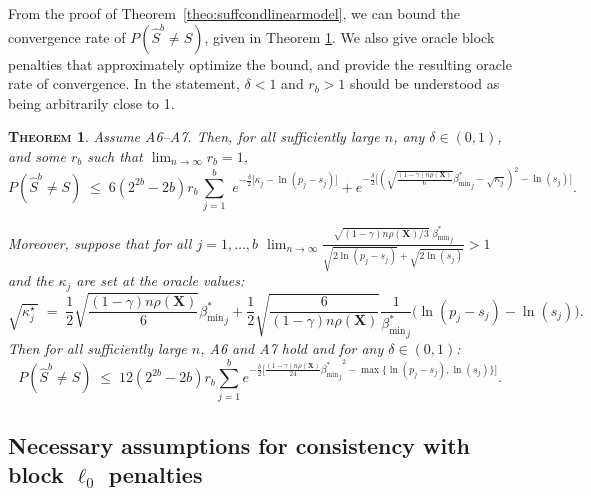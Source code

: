 \documentclass[aos]{imsart}
\theoremstyle{plain}
\newtheorem{thm}{\textsc{Theorem}}[section]
\newcommand{\bs}{\boldsymbol}
\begin{document}
From the proof of Theorem~\ref{theo:suffcondlinearmodel}, we can bound the convergence rate of $P(\hat S^{b}\neq S)$, given in Theorem \ref{prop:fullrecovreg}. We also give oracle block penalties that approximately optimize the bound, and provide the resulting oracle rate of convergence. 
In the statement, $\delta<1$ and $r_b>1$ should be understood as being arbitrarily close to 1. 
\begin{thm}\label{prop:fullrecovreg}
Assume A6--A7.  Then, for all sufficiently large $n$, any $\delta \in (0,1)$, and some $r_b$ such that $\lim_{n \rightarrow \infty} r_b=1$, 
\begin{equation}\label{eq:rateconvreg}
 P(\hat{S}^{b} \neq S)\;\leq\; 6(2^{2b}-2b)r_b\,\sum_{j=1}^b\,\, e^{-\tfrac{\delta}{2}\big[\kappa_j-\ln(p_j-s_j)\big]} + 
    e^{-\tfrac{\delta}{2}\big[(\sqrt{\frac{(1-\gamma) n\rho(\bs X)}{6}}{{\beta_{\min}^*}_j} - \sqrt{\kappa_j})^2 -\ln(s_j) \big]}.
\end{equation}

Moreover, suppose that for all $j=1,\ldots,b$ $\lim_{n\to \infty}\frac{\sqrt{(1-\gamma) n\rho(\bs X)/3}\;{\beta_{\min}^*}_j}{\sqrt{2\ln(p_j-s_j)} + \sqrt{2\ln(s_j)}} >1$ and the $\kappa_j$ are set at the oracle values:
	\begin{equation} \label{eq:oraclepenreg}
\sqrt{\kappa^\star_j\,} \;=\; \frac12\sqrt{\frac{(1-\gamma) n\rho(\bs X)}{6}}{{\beta_{\min}^*}_j}+\frac12\sqrt{\frac{6}{(1-\gamma) n\rho(\bs X)}}\frac{1}{{\beta_{\min}^*}_j}\big(\ln({p_j-s_j})-\ln({s_j})\big).
\end{equation}
Then for all sufficiently large $n$, A6 and A7 hold and for any $\delta \in (0,1)$: 
\begin{equation}\label{eq:oraclerateconvreg}
    P(\hat{S}^{b} \neq S) \; \leq \; 12(2^{2b}-2b)r_b \sum_{j=1}^b e^{-\tfrac{\delta}{2}\big[\frac{(1-\gamma) n\rho(\bs X)}{24}{{\beta_{\min}^*}_j}^2-\max\{\ln(p_j-s_j),\ln(s_j)\}\big]}.
\end{equation}
\end{thm}


\subsection{Necessary assumptions for consistency with block $\ell_0$ penalties}\label{ssec:neccond_linreg}
\end{document}
